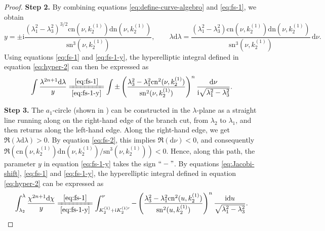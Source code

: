 \documentclass[11pt,reqno]{amsart}
\newcommand{\ii}{\mathrm{i}}
\newcommand{\sn}{\mathrm{sn}}
\newcommand{\cn}{\mathrm{cn}}
\newcommand{\dn}{\mathrm{dn}}
\newcommand{\dd}{\mathrm{d}}
\numberwithin{equation}{section}
\begin{document}
\begin{proof}
	\textbf{Step 2.}	
	By combining
	equations \eqref{eq:define-curve-algebro} and \eqref{eq:fs-1}, we obtain 
	\begin{equation}\label{eq:fs-1-y}
			y= \pm \ii \frac{(\lambda_1^2-\lambda_3^2)^{3/2}\cn(\nu,  k^{(1)}_2)\dn(\nu,  k^{(1)}_2)}{\sn^3(\nu,  k^{(1)}_2)}, \qquad
			\lambda\dd \lambda= \frac{(\lambda_1^2-\lambda_3^2)\cn(\nu,  k^{(1)}_2)\dn(\nu,  k^{(1)}_2)}{\sn^3(\nu,  k^{(1)}_2)}\, \dd \nu.
	\end{equation}
	Using equations \eqref{eq:fs-1} and \eqref{eq:fs-1-y}, the hyperelliptic integral defined in equation \eqref{eq:hyper-2} can then be expressed as 
	\begin{equation}\label{eq:elliptic-funda-2}
		\int \frac{\lambda^{2n+1} \dd \lambda}{y}\xlongequal[\eqref{eq:fs-1-y}]{\eqref{eq:fs-1}} \int \pm \left(\frac{\lambda_3^2-\lambda_1^2\cn^2(\nu,k^{(1)}_2)}{\sn^2(\nu,k^{(1)}_2)}\right)^n \frac{\dd \nu}{\ii \sqrt{\lambda_1^2-\lambda_3^2}}.
	\end{equation} 
	
	\textbf{Step 3.}
	The $a_1$-circle (shown in ) can be constructed in the $\lambda$-plane as a straight line running along on the right-hand edge of the branch cut, from $\lambda_2$ to $\lambda_1$, and then returns along the left-hand edge.
	Along the right-hand edge, we get $\Re(\lambda \dd \lambda)>0$. 
	By equation \eqref{eq:fs-2}, this implies $\Re(\dd \nu)<0$, and consequently $\Re(\cn(\nu,  k^{(1)}_2)\dn(\nu,  k^{(1)}_2)/\sn^3(\nu,  k^{(1)}_2))<0$.
	Hence, along this path, the parameter $y$ in equation \eqref{eq:fs-1-y} takes the sign $``-"$.
	By equations \eqref{eq:Jacobi-shift}, \eqref{eq:fs-1} and \eqref{eq:fs-1-y}, the hyperelliptic integral defined in equation \eqref{eq:hyper-2} can be expressed as 
	\begin{equation}\label{eq:elliptic-funda-2-ge}
		\int_{\lambda_2}^{\lambda}\frac{\chi^{2n+1} \dd \chi}{y}\xlongequal[\eqref{eq:fs-1-y}]{\eqref{eq:fs-1}}\int_{K^{(1)}_2+\ii K^{(1)\prime}_2}^{\nu}-\left(\frac{\lambda_3^2-\lambda_1^2\cn^2(u,k^{(1)}_2)}{\sn^2(u,k^{(1)}_2)}\right)^n \frac{\ii\dd u}{ \sqrt{\lambda_1^2-\lambda_3^2}}.
	\end{equation}
	

\end{proof}
\end{document}
